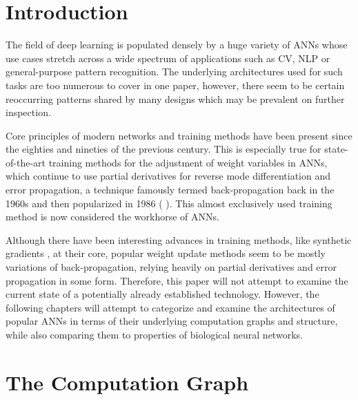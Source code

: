 \section{Introduction}

The field of deep learning is populated densely by a huge variety of \acp{ANN} whose use cases stretch across a wide spectrum of applications such as \acf{CV}, \acf{NLP} or general-purpose pattern recognition. 
The underlying architectures used for such tasks are too numerous to cover in one paper, however, there seem to be certain reoccurring patterns shared by many designs which may be prevalent on further inspection.
\cite[p. 12-14]{1_ANNs_2000} \cite[p. 0-1]{2_ANN-survey_2017}

Core principles of modern networks and training methods have been present since the eighties and nineties of the previous century. 
This is especially true for state-of-the-art training methods for the adjustment of weight variables in \acp{ANN}, which continue to use partial derivatives for reverse mode differentiation and error propagation, a technique famously termed back-propagation back in the 1960s and then popularized in 1986 ( \cite{0_learning-representations-1986}). 
This almost exclusively used training method is now considered the workhorse of \acp{ANN}.
\cite[p. 14-15]{1_ANNs_2000} \cite[p. ~33]{3_ANN-introduction_1993}

Although there have been interesting advances in training methods, like synthetic gradients \cite{4_synthetic-gradients_2017}, at their core, popular weight update methods seem to be mostly variations of back-propagation, relying heavily on partial derivatives and error propagation in some form. \cite[section 6.5-6.6]{Goodfellow-et-al-2016}
Therefore, this paper will not attempt to examine the current state of a potentially already established technology.
However, the following chapters will attempt to categorize and examine the architectures of popular \acp{ANN} in terms of their underlying computation graphs and structure, while also comparing them to properties of biological neural networks.

\clearpage


\section{The Computation Graph}


